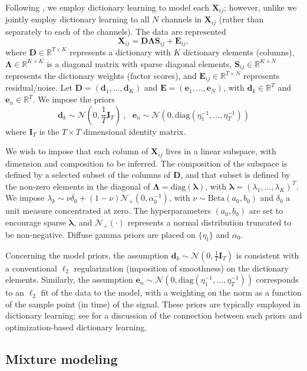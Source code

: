 \documentclass[journal]{IEEEtran}
\def\bf{\mathbf}
\newcommand{\beq}{\begin{equation}}
\newcommand{\eeq}{\end{equation}}
\newcommand{\Dmat}{{\bf D}}
\newcommand{\Emat}{{\bf E}}
\newcommand{\Imat}{{\bf I}}
\newcommand{\Smat}{{\bf S}}
\newcommand{\Xmat}{{\bf X}}
\newcommand{\dv}{\boldsymbol{d}}
\newcommand{\ev}{\boldsymbol{e}}
\newcommand{\Lambdamat}{\boldsymbol{\Lambda}}
\newcommand{\lambdav}{\boldsymbol{\lambda}}
\begin{document}
Following \cite{Bo2011}, we employ dictionary learning to model each $\Xmat_{ij}$; however, unlike \cite{Bo2011} we jointly employ dictionary learning to all $N$ channels in $\Xmat_{ij}$ (rather than separately to each of the channels). The data are represented
\beq\Xmat_{ij}=\Dmat \Lambdamat \Smat_{ij}+\Emat_{ij},\label{eq:basic}\eeq
where $\Dmat\in\mathbb{R}^{T\times K}$ represents a dictionary with $K$ dictionary elements (columns), $\Lambdamat\in\mathbb{R}^{K\times K}$ is a diagonal matrix with sparse diagonal elements, $\Smat_{ij}\in\mathbb{R}^{K\times N}$ represents the dictionary weights (factor scores), and $\Emat_{ij}\in\mathbb{R}^{T\times N}$ represents residual/noise. Let $\Dmat=(\dv_1,\dots,\dv_K)$ and $\Emat=(\ev_1,\dots,\ev_N)$, with $\dv_k\in\mathbb{R}^T$ and $\ev_n\in\mathbb{R}^T$. We impose the priors
\beq \dv_k\sim\mathcal{N}(0,\frac{1}{T}\Imat_T)~,~~~ \ev_n\sim\mathcal{N}(0,\mbox{diag}(\eta_1^{-1},\dots,\eta_T^{-1}))\eeq
where $\Imat_T$ is the $T\times T$ dimensional identity matrix.

We wish to impose that each column of $\Xmat_{ij}$ lives in a linear subspace, with dimension and composition to be inferred. The composition of the subspace is defined by a selected subset of the columns of $\Dmat$, and that subset is defined by the non-zero elements in the diagonal of $\Lambdamat=\mbox{diag}(\lambdav)$, with $\lambdav=(\lambda_1,\dots,\lambda_K)^T$. We impose $\lambda_k\sim\nu\delta_0+(1-\nu)\mathcal{N}_+(0,\alpha_0^{-1})$, with $\nu\sim\mbox{Beta}(a_0,b_0)$ and $\delta_0$ a unit measure concentrated at zero. The hyperparameters $(a_0,b_0)$ are set to encourage sparse $\lambdav$, and $\mathcal{N}_+(\cdot)$ represents a normal distribution truncated to be non-negative. Diffuse gamma priors are placed on $\{\eta_t\}$ and $\alpha_0$.

Concerning the model priors, the assumption $\dv_k\sim\mathcal{N}(0,\frac{1}{T}\Imat_T)$ is consistent with a conventional $\ell_2$ regularization (imposition of smoothness) on the dictionary elements. Similarly, the assumption $\ev_n\sim\mathcal{N}(0,\mbox{diag}(\eta_1^{-1},\dots,\eta_T^{-1}))$ corresponds to an $\ell_2$ fit of the data to the model, with a weighting on the norm as a function of the sample point (in time) of the signal. These priors are typically employed in dictionary learning; see \cite{Zhou12} for a discussion of the connection between such priors and optimization-based dictionary learning.

\subsection{Mixture modeling}
\end{document}
